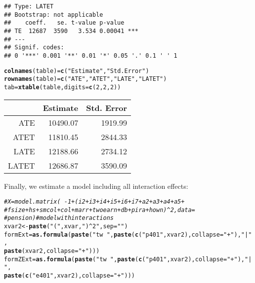 \documentclass{amsart}\usepackage[]{graphicx}\usepackage[]{color}
\makeatletter
\newcommand{\hlnum}[1]{\textcolor[rgb]{0.686,0.059,0.569}{#1}}%
\newcommand{\hlstr}[1]{\textcolor[rgb]{0.192,0.494,0.8}{#1}}%
\newcommand{\hlcom}[1]{\textcolor[rgb]{0.678,0.584,0.686}{\textit{#1}}}%
\newcommand{\hlstd}[1]{\textcolor[rgb]{0.345,0.345,0.345}{#1}}%
\newcommand{\hlkwb}[1]{\textcolor[rgb]{0.69,0.353,0.396}{#1}}%
\newcommand{\hlkwc}[1]{\textcolor[rgb]{0.333,0.667,0.333}{#1}}%
\newcommand{\hlkwd}[1]{\textcolor[rgb]{0.737,0.353,0.396}{\textbf{#1}}}%
\newenvironment{kframe}{%
 \def\at@end@of@kframe{}%
 \ifinner\ifhmode%
  \def\at@end@of@kframe{\end{minipage}}%
  \begin{minipage}{\columnwidth}%
 \fi\fi%
 \def\FrameCommand##1{\hskip\@totalleftmargin \hskip-\fboxsep
 \colorbox{shadecolor}{##1}\hskip-\fboxsep
     \hskip-\linewidth \hskip-\@totalleftmargin \hskip\columnwidth}%
 \MakeFramed {\advance\hsize-\width
   \@totalleftmargin\z@ \linewidth\hsize
   \@setminipage}}%
 {\par\unskip\endMakeFramed%
 \at@end@of@kframe}
\newenvironment{knitrout}{}{} %
\makeatother
\begin{document}
\begin{knitrout}
\begin{kframe}
\begin{verbatim}
## Type: LATET 
## Bootstrap: not applicable 
##    coeff.   se. t-value p-value    
## TE  12687  3590   3.534 0.00041 ***
## ---
## Signif. codes:  
## 0 '***' 0.001 '**' 0.01 '*' 0.05 '.' 0.1 ' ' 1
\end{verbatim}
\begin{alltt}
\hlkwd{colnames}\hlstd{(table)} \hlkwb{=} \hlkwd{c}\hlstd{(}\hlstr{"Estimate"}\hlstd{,} \hlstr{"Std. Error"}\hlstd{)}
\hlkwd{rownames}\hlstd{(table)} \hlkwb{=} \hlkwd{c}\hlstd{(}\hlstr{"ATE"}\hlstd{,} \hlstr{"ATET "}\hlstd{,} \hlstr{"LATE"}\hlstd{,} \hlstr{"LATET"}\hlstd{)}
\hlstd{tab} \hlkwb{=} \hlkwd{xtable}\hlstd{(table,} \hlkwc{digits} \hlstd{=} \hlkwd{c}\hlstd{(}\hlnum{2}\hlstd{,} \hlnum{2}\hlstd{,} \hlnum{2}\hlstd{))}
\end{alltt}
\end{kframe}
\end{knitrout}

\begin{table}[ht]
\centering
\begin{tabular}{rrr}
  \hline
 & Estimate & Std. Error \\ 
  \hline
ATE & 10490.07 & 1919.99 \\ 
  ATET  & 11810.45 & 2844.33 \\ 
  LATE & 12188.66 & 2734.12 \\ 
  LATET & 12686.87 & 3590.09 \\ 
   \hline
\end{tabular}
\end{table}


Finally, we estimate a model including all interaction effects:

\begin{knitrout}
\color{fgcolor}\begin{kframe}
\begin{alltt}
\hlcom{# X = model.matrix(~ -1 + (i2 + i3 + i4 + i5 + i6 + i7 + a2 + a3 + a4 + a5 +}
\hlcom{# fsize + hs + smcol + col + marr + twoearn + db + pira + hown)^2, data =}
\hlcom{# pension) # model with interactions}
\hlstd{xvar2} \hlkwb{<-} \hlkwd{paste}\hlstd{(}\hlstr{"("}\hlstd{, xvar,} \hlstr{")^2"}\hlstd{,} \hlkwc{sep} \hlstd{=} \hlstr{""}\hlstd{)}
\hlstd{formExt} \hlkwb{=} \hlkwd{as.formula}\hlstd{(}\hlkwd{paste}\hlstd{(}\hlstr{"tw ~ "}\hlstd{,} \hlkwd{paste}\hlstd{(}\hlkwd{c}\hlstd{(}\hlstr{"p401"}\hlstd{, xvar2),} \hlkwc{collapse} \hlstd{=} \hlstr{"+"}\hlstd{),} \hlstr{"|"}\hlstd{,}
    \hlkwd{paste}\hlstd{(xvar2,} \hlkwc{collapse} \hlstd{=} \hlstr{"+"}\hlstd{)))}
\hlstd{formZExt} \hlkwb{=} \hlkwd{as.formula}\hlstd{(}\hlkwd{paste}\hlstd{(}\hlstr{"tw ~ "}\hlstd{,} \hlkwd{paste}\hlstd{(}\hlkwd{c}\hlstd{(}\hlstr{"p401"}\hlstd{, xvar2),} \hlkwc{collapse} \hlstd{=} \hlstr{"+"}\hlstd{),} \hlstr{"|"}\hlstd{,}
    \hlkwd{paste}\hlstd{(}\hlkwd{c}\hlstd{(}\hlstr{"e401"}\hlstd{, xvar2),} \hlkwc{collapse} \hlstd{=} \hlstr{"+"}\hlstd{)))}
\end{alltt}
\end{kframe}
\end{knitrout}
\end{document}
